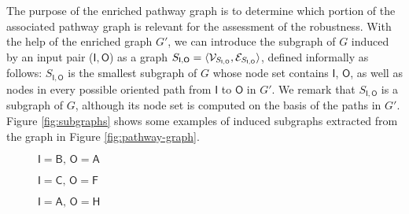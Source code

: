 \begin{figure*}[h!]
    \centering
    \resizebox{.6\textwidth}{!}{}
    \caption{The enriched pathway graph obtained from the pathway graph of Figure \ref{fig:pathway-graph}. The edges added with respect to the original graph are shown in black.}
    \label{fig:pathway-graph-enriched}
\end{figure*}
The purpose of the enriched pathway graph is to determine which portion of the associated pathway graph is relevant for the assessment of the robustness. With the help of the enriched graph $G'$, we can introduce the subgraph of $G$ induced by an input pair ($\mathsf{I},\mathsf{O}$) as a graph $S_{\mathsf{I},\mathsf{O}} = \Tuple{\Cal{V}_{S_{\mathsf{I},\mathsf{O}}}, \Cal{E}_{S_{\mathsf{I},\mathsf{O}}}}$, defined informally as follows: $S_{\mathsf{I},\mathsf{O}}$ is the smallest subgraph of $G$ whose node set contains $\mathsf{I}$, $\mathsf{O}$, as well as nodes in every possible oriented path from $\mathsf{I}$ to $\mathsf{O}$ in $G'$. We remark that $S_{\mathsf{I},\mathsf{O}}$ is a subgraph of $G$, although its node set is computed on the basis of the paths in $G'$. Figure \ref{fig:subgraphs} shows some examples of induced subgraphs extracted from the graph in Figure \ref{fig:pathway-graph}.
\begin{figure*}[h!]
    \begin{subfigure}[b]{0.24\linewidth}
        \centering
        \resizebox{.9\textwidth}{!}{}
        \caption{$\mathsf{I}=\mathsf{B},\, \mathsf{O}=\mathsf{A}$}\label{subfig:subgraph1}
    \end{subfigure}
    \begin{subfigure}[b]{0.29\linewidth}
        \centering
        \resizebox{.9\textwidth}{!}{}
        \caption{$\mathsf{I}=\mathsf{C},\, \mathsf{O}=\mathsf{F}$}\label{subfig:subgraph2}
    \end{subfigure}
    \begin{subfigure}[b]{0.44\linewidth}
        \centering
        \resizebox{.9\textwidth}{!}{}
        \caption{$\mathsf{I}=\mathsf{A},\, \mathsf{O}=\mathsf{H}$}\label{subfig:subgraph3}
    \end{subfigure}
    \caption{Examples of subgraphs of the pathway graph in Figure \ref{fig:pathway-graph} induced by different input/output node pairs $(\mathsf{I},\mathsf{O})$.}\label{fig:subgraphs}
\end{figure*}

